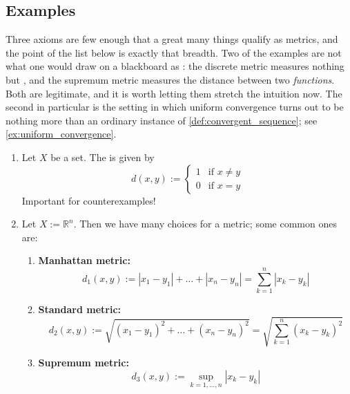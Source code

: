 \subsection{Examples}

Three axioms are few enough that a great many things qualify as metrics, and the point of the
list below is exactly that breadth. Two of the examples are not what one would draw on a
blackboard as : the discrete metric measures nothing but ,
and the supremum metric measures the distance between two \emph{functions}. Both are legitimate,
and it is worth letting them stretch the intuition now. The second in particular is the setting in
which uniform convergence turns out to be nothing more than an ordinary instance of
\cref{def:convergent_sequence}; see \cref{ex:uniform_convergence}.

\begin{example}
\label{ex:metric_examples}
\begin{enumerate}[label=\textbf{(\alph*)}]
  \item Let $X$ be a set. The  is given by
    \[d(x,y) := \begin{cases} 1 & \text{if } x \neq y \\ 0 & \text{if } x = y \end{cases}\]
    Important for counterexamples!
  \item Let $X := \mathbb{R}^n$. Then we have many choices for a metric; some common ones are:
  \begin{enumerate}[label=\textbf{(\roman*)}]
    \item \textbf{Manhattan metric:}
      \[d_1(x,y) := |x_1 - y_1| + \dots + |x_n - y_n| = \sum_{k=1}^{n} |x_k - y_k|\]
    \item \textbf{Standard metric:}
      \[d_2(x,y) := \sqrt{(x_1-y_1)^2 + \dots + (x_n-y_n)^2} = \sqrt{\sum_{k=1}^{n}(x_k - y_k)^2}\]
    \item \textbf{Supremum metric:}
      \[d_3(x,y) := \sup_{k = 1,\dots,n} |x_k - y_k|\]
  \end{enumerate}
\end{enumerate}
\end{example}

